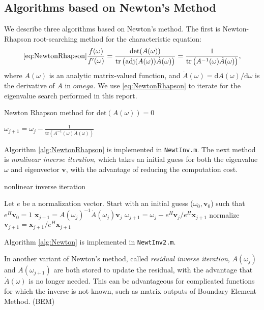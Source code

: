 \documentclass[final,leqno,onefignum,onetabnum]{siamltex1213}
\newcommand{\diff}{\mathrm{d}}
\begin{document}
\subsection{Algorithms based on Newton's Method}
We describe three algorithms based on Newton's method. 
The first is Newton-Rhapson root-searching method for the characteristic equation: 
\begin{equation*}\ref{eq:NewtonRhapson}
\frac{f(\omega)}{f'(\omega)} = \frac{\mathrm{det}(A(\omega))}{ \mathrm{tr} \left( \mathrm{adj}(A(\omega))\dot{A}(\omega)\right)} = \frac{1}{ \mathrm{tr}\left( A^{-1}(\omega)\dot{A}(\omega)\right)},
\end{equation*}
where $A(\omega)$ is an analytic matrix-valued function, and $\dot{A}(\omega)=\diff A(\omega)/\diff \omega$ is the derivative of $A$ in $omega$. We use \ref{eq:NewtonRhapson} to iterate for the eigenvalue search performed in this report. 
\begin{algorithm}
\caption{Newton Rhapson method for $\mathrm{det}(A(\omega))=0$}
\label{alg:NewtonRhapson}
\begin{algorithmic}
\STATE $\omega_{j+1} = \omega_j - \frac{1}{ \mathrm{tr}\left( A^{-1}(\omega)\dot{A}(\omega)\right)} $
\ENDFOR
\end{algorithmic}
\end{algorithm}
Algorithm \ref{alg:NewtonRhapson} is implemented in {\tt NewtInv.m}. 
The next method is {\it nonlinear inverse iteration}, \citep{anselone_solution_1968} which takes an initial guess for both the eigenvalue $\omega$ and eigenvector $\mathbf{v}$, with the advantage of reducing the computation cost. 
\begin{algorithm}
\caption{nonlinear inverse iteration}
\label{alg:Newton}
\begin{algorithmic}
\STATE Let $e$ be a normalization vector. Start with an initial guess ($\omega_0, \mathbf{v}_0$) such that $e^{H}\mathbf{v}_0=1$ 
\STATE $\mathbf{x}_{j+1} = A(\omega_j)^{-1} \dot{A}(\omega_j)\mathbf{v}_j$
\STATE $\omega_{j+1} = \omega_j - e^H\mathbf{v}_j/e^H\mathbf{x}_{j+1} $
\STATE normalize $\mathbf{v}_{j+1}=\mathbf{x}_{j+1}/e^{H}\mathbf{x}_{j+1}$
\ENDFOR
\end{algorithmic}
\end{algorithm}
Algorithm \ref{alg:Newton} is implemented in {\tt NewtInv2.m}. 

In another variant of Newton's method, called {\it residual inverse iteration}, \citep{neumaier1985residual} $A(\omega_j)$ and $A(\omega_{j+1})$ are both stored to update the residual, with the advantage that $\dot{A}(\omega)$ is no longer needed. This can be advantageous for complicated functions for which the inverse is not known, such as matrix outputs of Boundary Element Method. (BEM)
\end{document}
